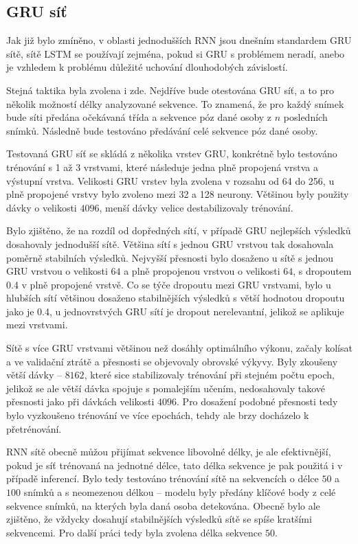 \subsection{GRU síť}

Jak již bylo zmíněno, v oblasti jednodušších RNN jsou dnešním standardem GRU
sítě, sítě LSTM se používají zejména, pokud si GRU s problémem neradí, anebo je
vzhledem k problému důležité uchování dlouhodobých závislostí.

Stejná taktika byla zvolena i zde. Nejdříve bude otestována GRU síť, a to pro
několik možností délky analyzované sekvence. To znamená, že pro každý snímek
bude síti předána očekávaná třída a sekvence póz dané osoby z $n$ posledních
snímků. Následně bude testováno předávání celé sekvence póz dané osoby.

Testovaná GRU síť se skládá z několika vrstev GRU, konkrétně bylo testováno
trénování s 1 až 3 vrstvami, které následuje jedna plně propojená vrstva a
výstupní vrstva. Velikosti GRU vrstev byla zvolena v rozsahu od 64 do 256, u
plně propojené vrstvy bylo zvoleno mezi 32 a 128 neurony. Většinou byly použity
dávky o velikosti $4096$, menší dávky velice destabilizovaly trénování.

Bylo zjištěno, že na rozdíl od dopředných sítí, v případě GRU nejlepších výsledků
dosahovaly jednodušší sítě. Většina sítí s jednou GRU vrstvou tak dosahovala
poměrně stabilních výsledků. Nejvyšší přesnosti bylo dosaženo u sítě s jednou
GRU vrstvou o velikosti $64$ a plně propojenou vrstvou o velikosti $64$, s
dropoutem 0.4 v plně propojené vrstvě. Co se týče dropoutu mezi GRU vrstvami,
bylo u hlubších sítí většinou dosaženo stabilnějších výsledků s větší hodnotou
dropoutu jako je 0.4, u jednovrstvých GRU sítí je dropout nerelevantní, jelikož
se aplikuje mezi vrstvami.

Sítě s více GRU vrstvami většinou než dosáhly optimálního výkonu, začaly
kolísat a ve validační ztrátě a přesnosti se objevovaly obrovské výkyvy. Byly
zkoušeny větší dávky – $8162$, které sice stabilizovaly trénování při stejném
počtu epoch, jelikož se ale větší dávka spojuje s pomalejším učením,
nedosahovaly takové přesnosti jako při dávkách velikosti $4096$. Pro dosažení
podobné přesnosti tedy bylo vyzkoušeno trénování ve více epochách, tehdy ale
brzy docházelo k přetrénování.

RNN sítě obecně můžou přijímat sekvence libovolné délky, je ale efektivnější,
pokud je síť trénovaná na jednotné délce, tato délka sekvence je pak použitá i
v případě inferencí. Bylo tedy testováno trénování sítě na sekvencích o délce
$50$ a $100$ snímků a s neomezenou délkou – modelu byly předány klíčové body z
celé sekvence snímků, na kterých byla daná osoba detekována. Obecně bylo ale
zjištěno, že vždycky dosahují stabilnějších výsledků sítě se spíše kratšími
sekvencemi. Pro další práci tedy byla zvolena délka sekvence $50$.


